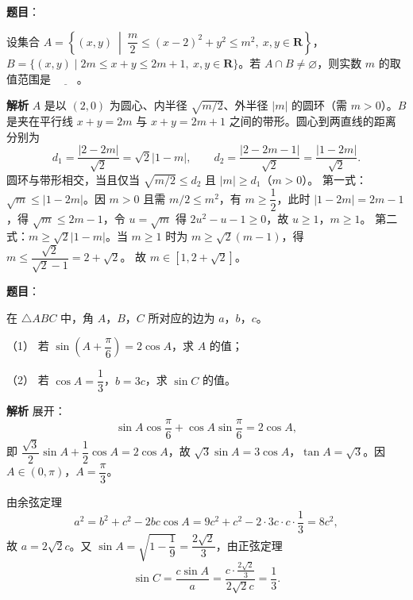 \begin{answer}

\textbf{题目}：

设集合 $A=\left\{(x,y)\ \middle|\ \dfrac m2\leqslant(x-2)^2+y^2\leqslant m^2,\ x,y\in\mathbf R\right\}$，$B=\{(x,y)\mid 2m\leqslant x+y\leqslant2m+1,\ x,y\in\mathbf R\}$。若 $A\cap B\neq\varnothing$，则实数 $m$ 的取值范围是 $\underline{\qquad}$。

\textbf{解析}
$A$ 是以 $(2,0)$ 为圆心、内半径 $\sqrt{m/2}$、外半径 $|m|$ 的圆环（需 $m>0$）。$B$ 是夹在平行线 $x+y=2m$ 与 $x+y=2m+1$ 之间的带形。圆心到两直线的距离分别为
\nopagebreak[4]
\[d_1=\frac{|2-2m|}{\sqrt2}=\sqrt2|1-m|,\qquad d_2=\frac{|2-2m-1|}{\sqrt2}=\frac{|1-2m|}{\sqrt2}.\]
圆环与带形相交，当且仅当 $\sqrt{m/2}\leqslant d_2$ 且 $|m|\geqslant d_1$（$m>0$）。
第一式：$\sqrt m\leqslant|1-2m|$。因 $m>0$ 且需 $m/2\leqslant m^2$，有 $m\geqslant\dfrac12$，此时 $|1-2m|=2m-1$，得 $\sqrt m\leqslant2m-1$，令 $u=\sqrt m$ 得 $2u^2-u-1\geqslant0$，故 $u\geqslant1$，$m\geqslant1$。
第二式：$m\geqslant\sqrt2|1-m|$。当 $m\geqslant1$ 时为 $m\geqslant\sqrt2(m-1)$，得 $m\leqslant\dfrac{\sqrt2}{\sqrt2-1}=2+\sqrt2$。
故 $m\in[1,2+\sqrt2]$。


\end{answer}
\begin{answer}

\textbf{题目}：

在 $\triangle ABC$ 中，角 $A$，$B$，$C$ 所对应的边为 $a$，$b$，$c$。

（1） 若 $\sin\left(A+\dfrac\pi6\right)=2\cos A$，求 $A$ 的值；

（2） 若 $\cos A=\dfrac13$，$b=3c$，求 $\sin C$ 的值。

\textbf{解析}
展开：
\nopagebreak[4]
\[\sin A\cos\frac\pi6+\cos A\sin\frac\pi6=2\cos A,\]
即 $\dfrac{\sqrt3}2\sin A+\dfrac12\cos A=2\cos A$，故 $\sqrt3\sin A=3\cos A$，$\tan A=\sqrt3$。因 $A\in(0,\pi)$，$A=\dfrac\pi3$。

由余弦定理
\nopagebreak[4]
\[a^2=b^2+c^2-2bc\cos A=9c^2+c^2-2\cdot3c\cdot c\cdot\frac13=8c^2,\]
故 $a=2\sqrt2c$。又 $\sin A=\sqrt{1-\dfrac19}=\dfrac{2\sqrt2}3$，由正弦定理
\nopagebreak[4]
\[\sin C=\frac{c\sin A}{a}=\frac{c\cdot\frac{2\sqrt2}3}{2\sqrt2c}=\frac13.\]



\end{answer}

